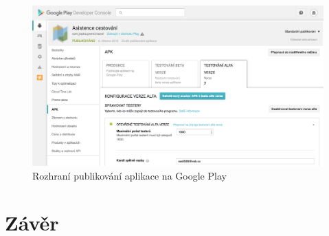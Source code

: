 \documentclass{article}
\begin{document}
\begin{figure}[H]
        \centering
                \includegraphics[scale=0.5]{img/playconsole.png}
        \caption{Rozhraní publikování aplikace na Google Play}
        \label{fig:playconsole}
\end{figure}


\section{Závěr}
\end{document}
